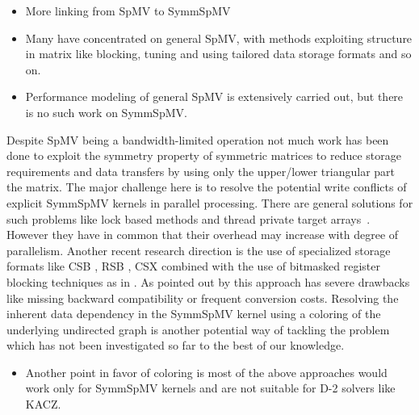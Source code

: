 \begin{itemize}
	\item More linking from \acrshort{SpMV} to \acrshort{SymmSpMV}
	\item Many have concentrated on general \acrshort{SpMV}, with methods exploiting
	 structure in matrix like blocking, tuning and using tailored data storage formats and so on.
	 \item Performance modeling of general \acrshort{SpMV} is extensively carried out,
	 but there is no such work on \acrshort{SymmSpMV}.
\end{itemize}



Despite \acrshort{SpMV} being a bandwidth-limited operation not much work has 
been done to exploit the symmetry property of symmetric matrices to reduce
storage requirements and data transfers by using only the upper/lower triangular part the matrix.
The major challenge here is to resolve the potential write conflicts of explicit \acrshort{SymmSpMV} kernels in parallel processing.
There are general solutions for such problems like 
lock based methods and thread private target
arrays~\cite{sparseX,thread_private_symm_spmv,Krotkiewski:2010:PSS:1752612.1752682,Mironowicz:2015}. However they have in common that their overhead may increase with degree of parallelism.
Another recent research direction is the use of specialized storage formats 
like CSB \cite{CSB}, RSB \cite{RSB}, CSX \cite{sparseX} combined with the use of bitmasked 
register blocking techniques as in \cite{Buluc:2011:RMA:2058524.2059503}. As pointed out 
by \cite{liu2015spmv} this approach has severe drawbacks like missing backward compatibility or frequent conversion costs.  
Resolving the inherent data dependency in the \acrshort{SymmSpMV} kernel using a \DTWO coloring of the underlying undirected graph is another potential way of tackling the problem which has not been investigated so far to the best of our knowledge.

\begin{itemize}
	\item Another point in favor of coloring is most of the above approaches would work only for \acrshort{SymmSpMV} kernels and are not suitable for D-2 solvers like KACZ.
\end{itemize}

